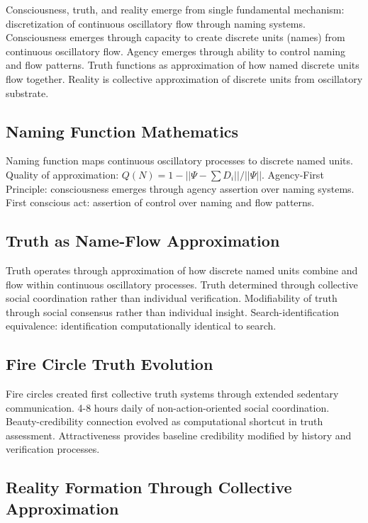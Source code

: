 \documentclass[12pt,a4paper]{article}
\begin{document}
Consciousness, truth, and reality emerge from single fundamental mechanism: discretization of continuous oscillatory flow through naming systems. Consciousness emerges through capacity to create discrete units (names) from continuous oscillatory flow. Agency emerges through ability to control naming and flow patterns. Truth functions as approximation of how named discrete units flow together. Reality is collective approximation of discrete units from oscillatory substrate.

\subsection{Naming Function Mathematics}

Naming function maps continuous oscillatory processes to discrete named units. Quality of approximation: $Q(N) = 1 - ||\Psi - \sum D_i|| / ||\Psi||$. Agency-First Principle: consciousness emerges through agency assertion over naming systems. First conscious act: assertion of control over naming and flow patterns.

\subsection{Truth as Name-Flow Approximation}

Truth operates through approximation of how discrete named units combine and flow within continuous oscillatory processes. Truth determined through collective social coordination rather than individual verification. Modifiability of truth through social consensus rather than individual insight. Search-identification equivalence: identification computationally identical to search.

\subsection{Fire Circle Truth Evolution}

Fire circles created first collective truth systems through extended sedentary communication. 4-8 hours daily of non-action-oriented social coordination. Beauty-credibility connection evolved as computational shortcut in truth assessment. Attractiveness provides baseline credibility modified by history and verification processes.

\subsection{Reality Formation Through Collective Approximation}
\end{document}
